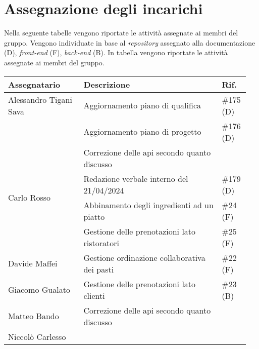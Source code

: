 \section{Assegnazione degli incarichi}
Nella seguente tabelle vengono riportate le attività assegnate ai membri del 
gruppo. Vengono individuate in base al \textit{repository} assegnato alla 
documentazione (D), \textit{front-end} (F), \textit{back-end} (B).
In tabella vengono riportate le attività assegnate ai membri del gruppo.
\begin{center}
	{
		\renewcommand{\arraystretch}{1.5}
		\begin{tabular}{p{0.30\linewidth}|p{0.55\linewidth}|p{0.10\linewidth}}
			\textbf{Assegnatario}			& \textbf{Descrizione}											& \textbf{Rif.} \\
			\hline
			Alessandro Tigani Sava			& Aggiornamento piano di qualifica								& \#175 (D)             \\
			\cline{2-3} 
											& Aggiornamento piano di progetto								& \#176 (D)             \\
			\cline{2-3}
											& Correzione delle api secondo quanto discusso					&						\\
			\hline
			\multirow{2}{*}{Carlo Rosso}	& Redazione verbale interno del 21/04/2024						& \#179 (D)             \\
			\cline{2-3} 
											& Abbinamento degli ingredienti ad un piatto					& \#24 (F)              \\
			\cline{2-3}
											& Gestione delle prenotazioni lato ristoratori					& \#25 (F)              \\
			\hline
			Davide Maffei					& Gestione ordinazione collaborativa dei pasti					& \#22 (F)              \\
			\hline
			Giacomo Gualato					& Gestione delle prenotazioni lato clienti						& \#23 (B)				\\
			\hline
			Matteo Bando                 	& Correzione delle api secondo quanto discusso                  &						\\
			\hline
			Niccolò Carlesso             	&                      &               \\
			\hline
		\end{tabular}
	}
\end{center}
